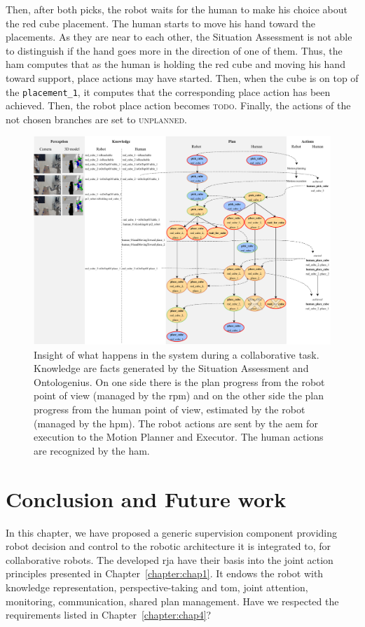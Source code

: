 \documentclass[a4paper,11pt,twoside]{StyleThese}
\begin{document}
Then, after both picks, the robot waits for the human to make his choice about the red cube placement. The human starts to move his hand toward the placements. As they are near to each other, the Situation Assessment is not able to distinguish if the hand goes more in the direction of one of them. Thus, the \acrlong{ham} computes that as the human is holding the red cube and moving his hand toward support, place actions may have started. Then, when the cube is on top of the \verb'placement_1', it computes that the corresponding place action has been achieved. Then, the robot place action becomes \textsc{todo}. Finally, the actions of the not chosen branches are set to \textsc{unplanned}.

\thispagestyle{example}
\begin{landscape}
\begin{figure}[!hbt]
	\centering
	\includegraphics[width=0.9\linewidth]{figures/chapter2/debut_tache_deroule.pdf}
	\caption{Insight of what happens in the system during a collaborative task. Knowledge are facts generated by the Situation Assessment and Ontologenius. On one side there is the plan progress from the robot point of view (managed by the \acrshort{rpm}) and on the other side the plan progress from the human point of view, estimated by the robot (managed by the \acrshort{hpm}). The robot actions are sent by the \acrshort{aem} for execution to the Motion Planner and Executor. The human actions are recognized by the \acrshort{ham}.}
	\label{chap6:fig:debut_tache_deroule}
\end{figure}
\end{landscape}
\restoregeometry

\section{Conclusion and Future work}
In this chapter, we have proposed a generic supervision component providing robot decision and control to the robotic architecture it is integrated to, for collaborative robots. The developed \acrfull{rja} have their basis into the joint action principles presented in Chapter~\ref{chapter:chap1}. It endows the robot with knowledge representation, perspective-taking and \acrshort{tom}, joint attention, monitoring, communication, shared plan management. Have we respected the requirements listed in Chapter~\ref{chapter:chap4}?
\end{document}
